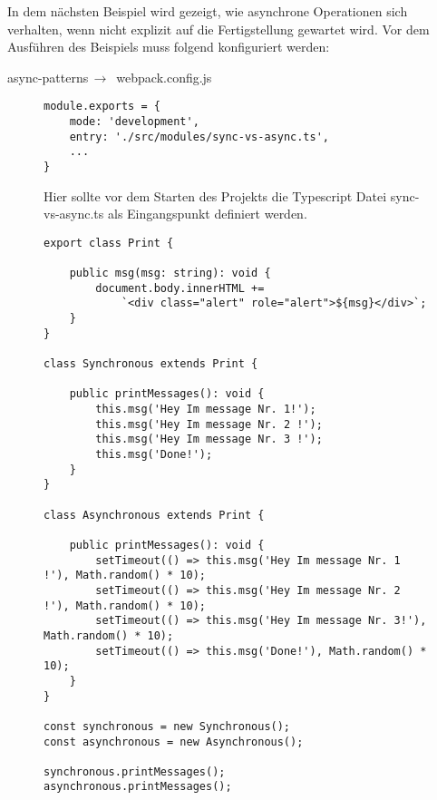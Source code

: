 In dem nächsten Beispiel wird gezeigt, wie asynchrone Operationen sich verhalten, wenn nicht explizit auf die Fertigstellung gewartet wird. Vor dem Ausführen des Beispiels muss folgend konfiguriert werden:

\begin{center}
    async-patterns$\,\to\,$ webpack.config.js
\end{center}

\begin{figure}[H]
\begin{lstlisting}[basicstyle=\small]
module.exports = {
    mode: 'development',
    entry: './src/modules/sync-vs-async.ts',
    ...
}
\end{lstlisting}
\caption{Hier sollte vor dem Starten des Projekts die Typescript Datei sync-vs-async.ts als Eingangspunkt definiert werden.}
\end{figure}

\begin{figure}[H]
\begin{lstlisting}[basicstyle=\small]
export class Print {

    public msg(msg: string): void {
        document.body.innerHTML +=
            `<div class="alert" role="alert">${msg}</div>`;
    }
}

class Synchronous extends Print {

    public printMessages(): void {
        this.msg('Hey Im message Nr. 1!');
        this.msg('Hey Im message Nr. 2 !');
        this.msg('Hey Im message Nr. 3 !');
        this.msg('Done!');
    }
}

class Asynchronous extends Print {

    public printMessages(): void {
        setTimeout(() => this.msg('Hey Im message Nr. 1 !'), Math.random() * 10);
        setTimeout(() => this.msg('Hey Im message Nr. 2 !'), Math.random() * 10);
        setTimeout(() => this.msg('Hey Im message Nr. 3!'), Math.random() * 10);
        setTimeout(() => this.msg('Done!'), Math.random() * 10);
    }
}

const synchronous = new Synchronous();
const asynchronous = new Asynchronous();

synchronous.printMessages();
asynchronous.printMessages();
\end{lstlisting}
\end{figure}

